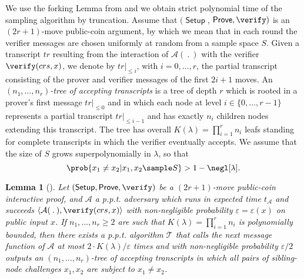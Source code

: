 \documentclass[10pt,article,oneside]{memoir}
\newtheorem{lem}[]{Lemma}
\theoremstyle{definition}
\theoremstyle{remark}
\DeclareMathOperator{\setup}{\mathsf{Setup}}
\DeclareMathOperator{\prove}{\mathsf{Prove}}
\begin{document}
We use the forking Lemma from \cite{BootleGroth} and we obtain strict polynomial time of the sampling algorithm by truncation. 
Assume that $(\setup$, $\prove,\verify)$ is an $(2r+1)$-move public-coin argument, by which we mean that in each round the verifier messages are chosen uniformly at random from a sample space $S$.
Given a transcript $tr$ resulting from the interaction of $\mathcal A(\:.\:)$ with the verifier $\verify(crs,x)$, we denote by $tr|_{\leq i}$, with $i=0,\ldots,r$, the partial transcript consisting of the prover and verifier messages of the first $2i+1$ moves. 
An \textit{$(n_1,\ldots,n_r)$-tree of accepting transcripts} is a tree of depth $r$ which is rooted in a prover's first message $tr|_{\leq 0}$ and in which each node at level  $i\in\{0,\ldots,r-1\}$ represents a partial transcript $tr|_{\leq i-1}$ and has exactly $n_i$ children nodes extending this transcript. 
The tree has overall $K(\lambda)=\prod_{i=1}^r n_i$ leafs standing for complete transcripts in which the verifier eventually accepts.
We assume that the size of $S$ grows superpolynomially in $\lambda$, so that 
\[
\prob{x_1\neq x_2  | x_1,x_2\sample S} > 1-\negl[\lambda].
\]
\begin{lem}[\cite{BootleGroth}]
\label{lem:ForkingLemma}
Let $(\setup,\prove,\verify)$ be a $(2r+1)$-move public-coin interactive proof, and $\mathcal A$ a p.p.t. adversary which runs in expected time $t_\mathcal A$ and succeeds $\langle\mathcal A(\:.\:),\verify(crs,x)\rangle$ with non-negligible probability $\varepsilon= \varepsilon(x)$ on public input $x$.  
If $n_1,\ldots,n_r\geq 2$ are such that $K(\lambda)=\prod_{i=1}^r n_i$ is polynomially bounded, then there exists a p.p.t. algorithm $\mathcal T$ that calls the next message function of $\mathcal A$ at most $2\cdot K(\lambda)/\varepsilon$ times and with non-negligible probability $\varepsilon/2$ outputs an $(n_1,\ldots,n_r)$-tree of accepting transcripts in which all pairs of sibling-node challenges $x_1,x_2$ are subject to $x_1\neq x_2$.
\end{lem}
 
\end{document}
